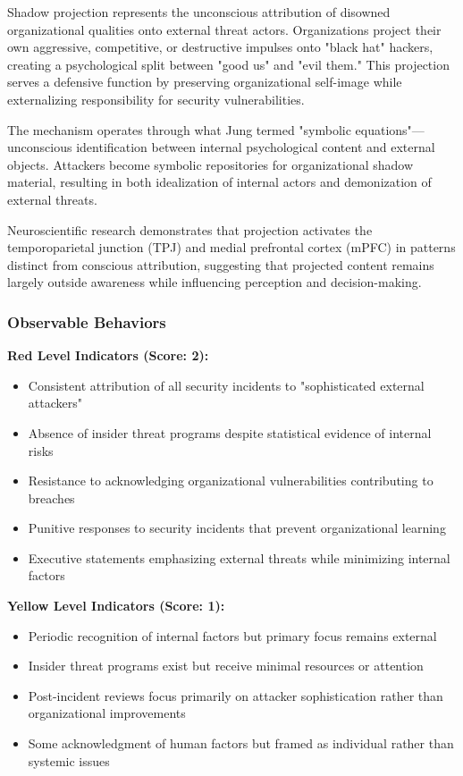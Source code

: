 \documentclass[11pt,a4paper]{article}
\begin{document}
Shadow projection represents the unconscious attribution of disowned organizational qualities onto external threat actors. Organizations project their own aggressive, competitive, or destructive impulses onto "black hat" hackers, creating a psychological split between "good us" and "evil them." This projection serves a defensive function by preserving organizational self-image while externalizing responsibility for security vulnerabilities.

The mechanism operates through what Jung termed "symbolic equations"---unconscious identification between internal psychological content and external objects\cite{jung1964}. Attackers become symbolic repositories for organizational shadow material, resulting in both idealization of internal actors and demonization of external threats.

Neuroscientific research demonstrates that projection activates the temporoparietal junction (TPJ) and medial prefrontal cortex (mPFC) in patterns distinct from conscious attribution, suggesting that projected content remains largely outside awareness while influencing perception and decision-making\cite{schurz2014}.

\subsubsection{Observable Behaviors}

\textbf{Red Level Indicators (Score: 2):}
\begin{itemize}
\item Consistent attribution of all security incidents to "sophisticated external attackers"
\item Absence of insider threat programs despite statistical evidence of internal risks
\item Resistance to acknowledging organizational vulnerabilities contributing to breaches
\item Punitive responses to security incidents that prevent organizational learning
\item Executive statements emphasizing external threats while minimizing internal factors
\end{itemize}

\textbf{Yellow Level Indicators (Score: 1):}
\begin{itemize}
\item Periodic recognition of internal factors but primary focus remains external
\item Insider threat programs exist but receive minimal resources or attention
\item Post-incident reviews focus primarily on attacker sophistication rather than organizational improvements
\item Some acknowledgment of human factors but framed as individual rather than systemic issues
\end{itemize}
\end{document}
